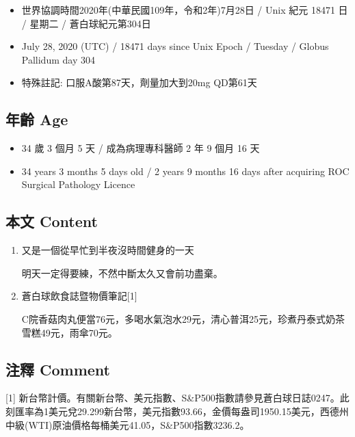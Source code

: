\documentclass[
]{article}
\providecommand{\tightlist}{%
  \setlength{\itemsep}{0pt}\setlength{\parskip}{0pt}}
\begin{document}
\begin{itemize}
\tightlist
\item
  世界協調時間2020年(中華民國109年，令和2年)7月28日 / Unix 紀元 18471 日
  / 星期二 / 蒼白球紀元第304日
\item
  July 28, 2020 (UTC) / 18471 days since Unix Epoch / Tuesday / Globus
  Pallidum day 304
\item
  特殊註記: 口服A酸第87天，劑量加大到20mg QD第61天
\end{itemize}

\hypertarget{ux5e74ux9f61-age-27}{%
\subsection{年齡 Age}\label{ux5e74ux9f61-age-27}}

\begin{itemize}
\tightlist
\item
  34 歲 3 個月 5 天 / 成為病理專科醫師 2 年 9 個月 16 天
\item
  34 years 3 months 5 days old / 2 years 9 months 16 days after
  acquiring ROC Surgical Pathology Licence
\end{itemize}

\hypertarget{ux672cux6587-content-27}{%
\subsection{本文 Content}\label{ux672cux6587-content-27}}

\begin{enumerate}
\def\labelenumi{\arabic{enumi}.}
\item
  又是一個從早忙到半夜沒時間健身的一天

  明天一定得要練，不然中斷太久又會前功盡棄。
\item
  蒼白球飲食誌暨物價筆記{[}1{]}

  C院香菇肉丸便當76元，多喝水氣泡水29元，清心普洱25元，珍煮丹泰式奶茶雪糕49元，雨傘70元。
\end{enumerate}

\hypertarget{ux6ce8ux91cb-comment-27}{%
\subsection{注釋 Comment}\label{ux6ce8ux91cb-comment-27}}

{[}1{]}
新台幣計價。有關新台幣、美元指數、S\&P500指數請參見蒼白球日誌0247。此刻匯率為1美元兌29.299新台幣，美元指數93.66，金價每盎司1950.15美元，西德州中級(WTI)原油價格每桶美元41.05，S\&P500指數3236.2。
\end{document}
